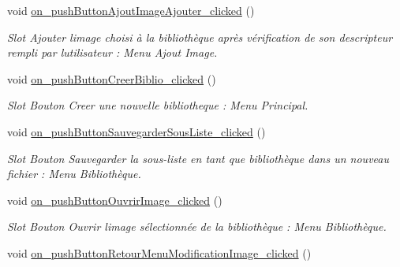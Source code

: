 \begin{DoxyCompactItemize}
\mbox{\label{classMainWindow_a99a0007db57453254e82797b4eb4bf1a}} 
void \hyperlink{classMainWindow_a99a0007db57453254e82797b4eb4bf1a}{on\+\_\+push\+Button\+Ajout\+Image\+Ajouter\+\_\+clicked} ()
\begin{DoxyCompactList}\small\item\em Slot Ajouter l\textquotesingle{}image choisi à la bibliothèque après vérification de son descripteur rempli par l\textquotesingle{}utilisateur \+: Menu Ajout Image. \end{DoxyCompactList}\item 
\mbox{\label{classMainWindow_ac70efc539a8c362a65469329f58e0db1}} 
void \hyperlink{classMainWindow_ac70efc539a8c362a65469329f58e0db1}{on\+\_\+push\+Button\+Creer\+Biblio\+\_\+clicked} ()
\begin{DoxyCompactList}\small\item\em Slot Bouton Creer une nouvelle bibliotheque \+: Menu Principal. \end{DoxyCompactList}\item 
\mbox{\label{classMainWindow_a9e4fb81b32de37afdbbddfa67288452a}} 
void \hyperlink{classMainWindow_a9e4fb81b32de37afdbbddfa67288452a}{on\+\_\+push\+Button\+Sauvegarder\+Sous\+Liste\+\_\+clicked} ()
\begin{DoxyCompactList}\small\item\em Slot Bouton Sauvegarder la sous-\/liste en tant que bibliothèque dans un nouveau fichier \+: Menu Bibliothèque. \end{DoxyCompactList}\item 
\mbox{\label{classMainWindow_a07a876cbbff67e47d60cbda1316d5b75}} 
void \hyperlink{classMainWindow_a07a876cbbff67e47d60cbda1316d5b75}{on\+\_\+push\+Button\+Ouvrir\+Image\+\_\+clicked} ()
\begin{DoxyCompactList}\small\item\em Slot Bouton Ouvrir l\textquotesingle{}image sélectionnée de la bibliothèque \+: Menu Bibliothèque. \end{DoxyCompactList}\item 
\mbox{\label{classMainWindow_ae1ca6c5420cf50c889056f3732b271bf}} 
void \hyperlink{classMainWindow_ae1ca6c5420cf50c889056f3732b271bf}{on\+\_\+push\+Button\+Retour\+Menu\+Modification\+Image\+\_\+clicked} ()

\end{DoxyCompactItemize}

